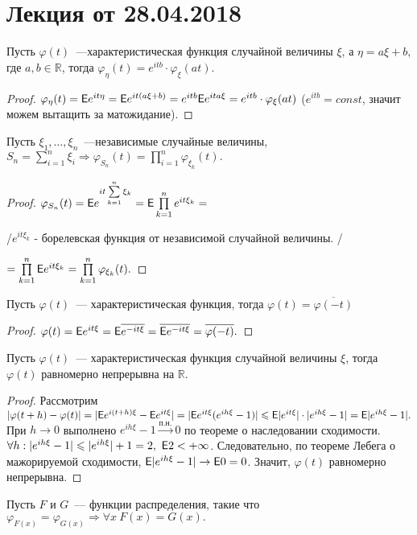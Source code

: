 \section{Лекция от 28.04.2018}

	\begin{property}
		Пусть $\varphi(t)$~---характеристическая функция случайной величины $\xi$, а $\eta = a\xi + b$, где $a, b \in \mathbb{R}$, тогда $\varphi_\eta(t) = e^{itb}\cdot \varphi_\xi(at).$
		\begin{proof}
			$\varphi_\eta(t) = \mathsf{E} e^{it\eta} = \mathsf{E} e^{it(a\xi + b)} = e^{itb} \mathsf{E} e^{ita\xi} = e^{itb}\cdot \varphi_\xi(at)$ ($e^{itb} = const$, значит можем вытащить за матожидание).
		\end{proof}
	\end{property}

	\begin{property}
		Пусть $\xi_1, \ldots, \xi_n$~---независимые случайные величины, $S_n = \sum\limits_{i = 1}^{n}\xi_i \Rightarrow \varphi_{S_n}(t) = \prod\limits_{i = 1}^n\varphi_{\xi_k}(t).$  
		\begin{proof}
			$\varphi_{S_n}(t) = \mathsf{E} e^{it \sum\limits_{k = 1}^{n}\xi_k} = \mathsf{E}\prod\limits_{k = 1}^n e^{it\xi_k} =$ 
			
			/$e^{it\xi_k}$ - борелевская функция от независимой случайной величины. / 
			
			$= \prod\limits_{k = 1}^{n}\mathsf{E} e^{it\xi_k} = \prod\limits_{k = 1}^{n}\varphi_{\xi_k}(t).$
		\end{proof}
	\end{property}
	\begin{property}
		Пусть $\varphi(t)$~--- характеристическая функция, тогда $\varphi(t) = \overline{\varphi(-t)}$
		\begin{proof}
			$\varphi(t) = \mathsf{E} e^{it\xi} = \mathsf{E}\overline{e^{-it\xi}} = \overline{\mathsf{E} e^{-it\xi}} = \overline{\varphi(-t)}.$
		\end{proof}
	\end{property}
	\begin{property}
		Пусть $\varphi(t)$~--- характеристическая функция случайной величины $\xi$, тогда $\varphi(t)$ равномерно непрерывна на $\mathbb{R}.$
		\begin{proof}
			Рассмотрим $|\varphi(t + h) - \varphi(t)| = |\mathsf{E} e^{i(t+h)\xi} - \mathsf{E} e^{it\xi}| = |\mathsf{E} e^{it\xi}(e^{ih\xi} - 1)| \leqslant \mathsf{E} |e^{it\xi}|\cdot |e^{ih\xi} - 1| = \mathsf{E} |e^{ih\xi} - 1|.$
			При $h \to 0$ выполнено $e^{ih\xi} - 1 \overset{\text{п.н.}} \longrightarrow 0 $ по теореме о наследовании сходимости. $\forall h: |e^{ih\xi} - 1| \leqslant |e^{ih\xi}| + 1 = 2, ~ \mathsf{E} 2 < +\infty$. Следовательно, по теореме Лебега о мажорируемой сходимости, $\mathsf{E} |e^{ih\xi} - 1| \to \mathsf{E} 0 = 0$. Значит, $\varphi(t)$ равномерно непрерывна.
		\end{proof}
	\end{property}
		\begin{theorem}
		Пусть $F$ и $G$~--- функции распределения, такие что $\varphi_{F(x)} = \varphi_{G(x)} \Rightarrow \forall x\  F(x) = G(x).$
	\end{theorem}
	
